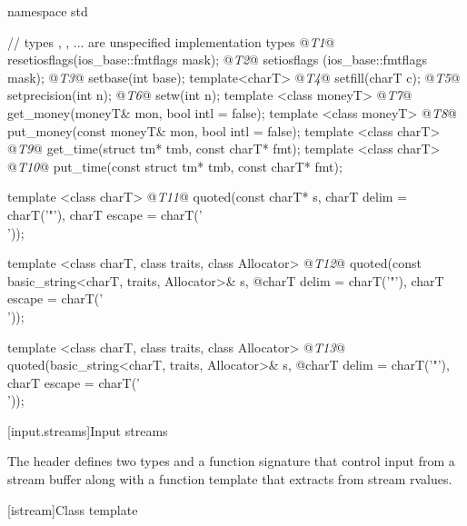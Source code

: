 %

\begin{codeblock}
namespace std {
  // types , , ... are unspecified implementation types
  @\textit{T1}@ resetiosflags(ios_base::fmtflags mask);
  @\textit{T2}@ setiosflags  (ios_base::fmtflags mask);
  @\textit{T3}@ setbase(int base);
  template<charT> @\textit{T4}@ setfill(charT c);
  @\textit{T5}@ setprecision(int n);
  @\textit{T6}@ setw(int n);
  template <class moneyT> @\textit{T7}@ get_money(moneyT& mon, bool intl = false);
  template <class moneyT> @\textit{T8}@ put_money(const moneyT& mon, bool intl = false);
  template <class charT> @\textit{T9}@ get_time(struct tm* tmb, const charT* fmt);
  template <class charT> @\textit{T10}@ put_time(const struct tm* tmb, const charT* fmt);

  template <class charT>
    @\textit{T11}@ quoted(const charT* s, charT delim = charT('"'), charT escape = charT('\\'));

  template <class charT, class traits, class Allocator>
    @\textit{T12}@ quoted(const basic_string<charT, traits, Allocator>& s,
    @\itcorr@           charT delim = charT('"'), charT escape = charT('\\'));

  template <class charT, class traits, class Allocator>
    @\textit{T13}@ quoted(basic_string<charT, traits, Allocator>& s,
    @\itcorr@           charT delim = charT('"'), charT escape = charT('\\'));
}
\end{codeblock}

[input.streams]{Input streams}

\pnum
The header
defines two types
and a function signature that control input from a stream buffer along with a function template that extracts from stream rvalues.

[istream]{Class template }


